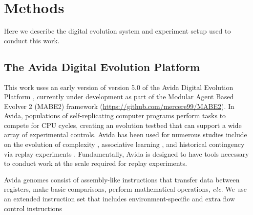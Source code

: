 \section{Methods}
Here we describe the digital evolution system and experiment setup used to conduct this work.

\subsection{The Avida Digital Evolution Platform}
\label{sub-evo-software}

This work uses an early version of version 5.0 of the Avida Digital Evolution Platform \citep{ofriaAvidaSoftwarePlatform2004a}, currently under development as part of the Modular Agent Based Evolver 2 (MABE2) framework (\href{https://github.com/mercere99/MABE2}{https://github.com/mercere99/MABE2}).
In Avida, populations of self-replicating computer programs perform tasks to compete for CPU cycles, creating an evolution testbed that can support a wide array of experimental controls. 
Avida has been used for numerous studies include on the evolution of complexity \citep{lenskiEvolutionaryOriginComplex2003, zamanCoevolutionDrivesEmergence2014}, associative learning \citep{pontesEvolutionaryOriginAssociative2020, grabowskiEarlyEvolutionMemory2010a}, and historical contingency via replay experiments \citep{yedidHistoricalContingentFactors2008, covertiiiExperimentsRoleDeleterious2013}.
Fundamentally, Avida is designed to have tools necessary to conduct work at the scale required for replay experiments. %

Avida genomes consist of assembly-like instructions that transfer data between registers, make basic comparisons, perform mathematical operations, \textit{etc}.
We use an extended instruction set that includes environment-specific and extra flow control instructions \citep{anonymousalifer_2023_7731472} 

